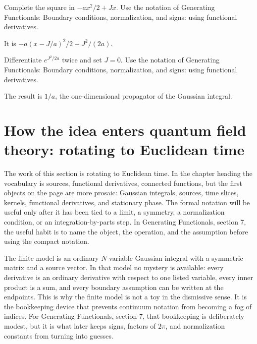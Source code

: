 \begin{exercise}
Complete the square in \(-ax^2/2+Jx\).  Use the notation of Generating Functionals: Boundary conditions, normalization, and signs: using functional derivatives.
\begin{answer}
It is \(-a(x-J/a)^2/2+J^2/(2a)\).
\end{answer}
\end{exercise}

\begin{exercise}
Differentiate \(e^{J^2/2a}\) twice and set \(J=0\).  Use the notation of Generating Functionals: Boundary conditions, normalization, and signs: using functional derivatives.
\begin{answer}
The result is \(1/a\), the one-dimensional propagator of the Gaussian integral.
\end{answer}
\end{exercise}



\section{How the idea enters quantum field theory: rotating to Euclidean time}

The work of this section is rotating to Euclidean time.  In the chapter heading the vocabulary is sources, functional derivatives, connected functions, but the first objects on the page are more prosaic: Gaussian integrals, sources, time slices, kernels, functional derivatives, and stationary phase.  The formal notation will be useful only after it has been tied to a limit, a symmetry, a normalization condition, or an integration-by-parts step.  In Generating Functionals, section 7, the useful habit is to name the object, the operation, and the assumption before using the compact notation.

The finite model is an ordinary \(N\)-variable Gaussian integral with a symmetric matrix and a source vector.  In that model no mystery is available: every derivative is an ordinary derivative with respect to one listed variable, every inner product is a sum, and every boundary assumption can be written at the endpoints.  This is why the finite model is not a toy in the dismissive sense.  It is the bookkeeping device that prevents continuum notation from becoming a fog of indices.  For Generating Functionals, section 7, that bookkeeping is deliberately modest, but it is what later keeps signs, factors of \(2\pi\), and normalization constants from turning into guesses.

